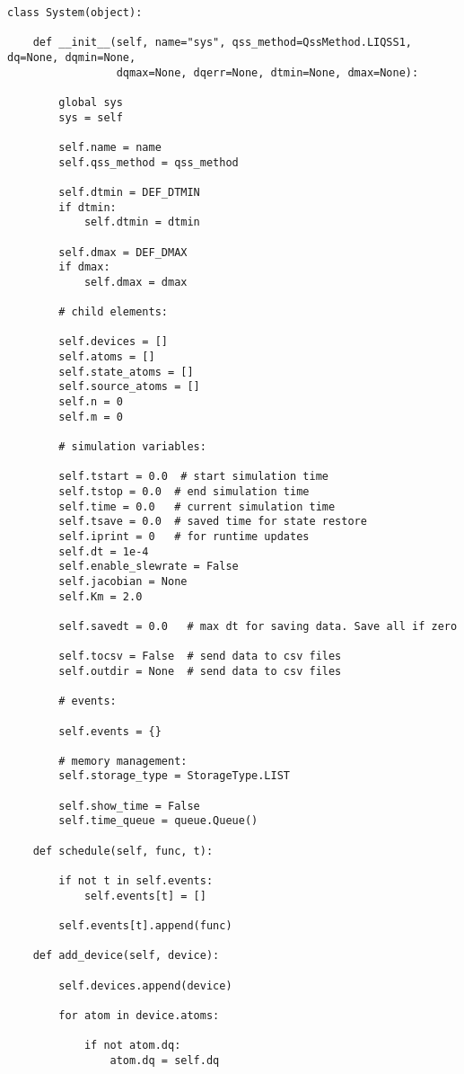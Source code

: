 \begin{lstlisting}
class System(object):

    def __init__(self, name="sys", qss_method=QssMethod.LIQSS1, dq=None, dqmin=None,
                 dqmax=None, dqerr=None, dtmin=None, dmax=None):

        global sys
        sys = self

        self.name = name
        self.qss_method = qss_method

        self.dtmin = DEF_DTMIN
        if dtmin:
            self.dtmin = dtmin

        self.dmax = DEF_DMAX
        if dmax:
            self.dmax = dmax

        # child elements:

        self.devices = []
        self.atoms = []
        self.state_atoms = []
        self.source_atoms = []
        self.n = 0
        self.m = 0

        # simulation variables:

        self.tstart = 0.0  # start simulation time
        self.tstop = 0.0  # end simulation time
        self.time = 0.0   # current simulation time
        self.tsave = 0.0  # saved time for state restore
        self.iprint = 0   # for runtime updates
        self.dt = 1e-4
        self.enable_slewrate = False
        self.jacobian = None
        self.Km = 2.0

        self.savedt = 0.0   # max dt for saving data. Save all if zero

        self.tocsv = False  # send data to csv files
        self.outdir = None  # send data to csv files

        # events:

        self.events = {}

        # memory management:
        self.storage_type = StorageType.LIST

        self.show_time = False
        self.time_queue = queue.Queue()

    def schedule(self, func, t):

        if not t in self.events:
            self.events[t] = []

        self.events[t].append(func)

    def add_device(self, device):

        self.devices.append(device)

        for atom in device.atoms:

            if not atom.dq:
                atom.dq = self.dq


\end{lstlisting}
